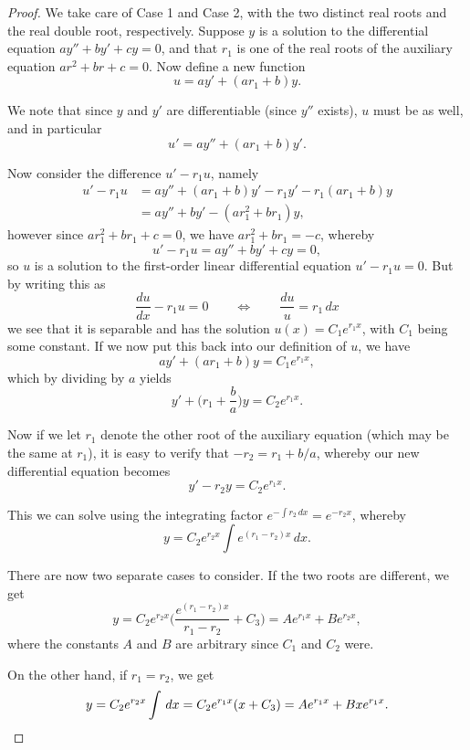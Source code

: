 \begin{proof}
	 We take care of Case 1 and Case 2, with the two distinct real roots and the real double root, respectively.
	 Suppose $y$ is a solution to the differential equation $a y'' + b y' + c y = 0$, and that $r_1$ is one of the real roots of the auxiliary equation $a r^2 + b r + c = 0$.
	 Now define a new function
	 \[
	 	u = a y' + (a r_1 + b) y.
	 \]

	 \noindent
	 We note that since $y$ and $y'$ are differentiable (since $y''$ exists), $u$ must be as well, and in particular
	 \[
	 	u' = a y'' + (a r_1 + b) y'.
	 \]

	 \noindent
	 Now consider the difference $u' - r_1 u$, namely
	 \begin{align*}
		 u' - r_1 u &= a y'' + (a r_1 + b) y' - r_1 y' - r_1 (a r_1 + b) y \\
		            &= a y'' + b y' - (a r_1^2 + b r_1) y,
	 \end{align*}
	 however since $a r_1^2 + b r_1 + c = 0$, we have $a r_1^2 + b r_1 = -c$, whereby
	 \[
	 	u' - r_1 u = a y'' + b y' + c y = 0,
	 \]
	 so $u$ is a solution to the first-order linear differential equation $u' - r_1 u = 0$.
	 But by writing this as
	 \[
	 	\frac{d u}{d x} - r_1 u = 0 \qquad \Longleftrightarrow \qquad \frac{d u}{u} = r_1 \, d x
	 \]
	 we see that it is separable and has the solution $u(x) = C_1 e^{r_1 x}$, with $C_1$ being some constant.
	 If we now put this back into our definition of $u$, we have
	 \[
	 	a y' + (a r_1 + b) y = C_1 e^{r_1 x},
	 \]
	 which by dividing by $a$ yields
	 \[
	 	y' + \Big (r_1 + \frac{b}{a} \Big ) y = C_2 e^{r_1 x}.
	 \]

	 \noindent
	 Now if we let $r_1$ denote the other root of the auxiliary equation (which may be the same at $r_1$), it is easy to verify that $- r_2 = r_1 + b / a$, whereby our new differential equation becomes
	 \[
	 	y' - r_2 y = C_2 e^{r_1 x}.
	 \]

	 \noindent
	 This we can solve using the integrating factor $e^{- \int r_2 \, d x} = e^{-r_2 x}$, whereby
	 \[
	 	y = C_2 e^{r_2 x} \int e^{(r_1 - r_2) x} \, d x.
	 \]

	 \noindent
	 There are now two separate cases to consider.
	 If the two roots are different, we get
	 \[
	 	y = C_2 e^{r_2 x} \Big ( \frac{e^{(r_1 - r_2) x}}{r_1 - r_2} + C_3 \Big ) = A e^{r_1 x} + B e^{r_2 x},
	 \]
	 where the constants $A$ and $B$ are arbitrary since $C_1$ and $C_2$ were.

	 On the other hand, if $r_1 = r_2$, we get
	 \[
	 	y = C_2 e^{r_2 x} \int \, d x = C_2 e^{r_1 x} (x + C_3) = A e^{r_1 x} + B x e^{r_1 x}. \qedhere
	 \]
\end{proof}
